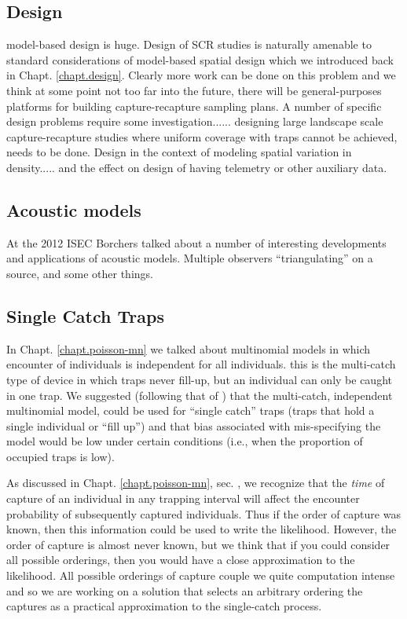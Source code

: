 \begin{table}[ht]
\subsection{Design}

model-based design is huge. Design of SCR studies is naturally
amenable to standard considerations of model-based spatial design
\citep{muller:2007} which we introduced back in
Chapt. \ref{chapt.design}. Clearly more work can be done on this
problem and we think at some point not too far into the future, there
will be general-purposes platforms for building capture-recapture
sampling plans.
A number of specific design problems require some
investigation...... designing large landscape scale capture-recapture
studies where uniform coverage with traps cannot be achieved, needs
to be done.
Design in the context of modeling spatial variation in
density..... and the effect on design of having telemetry or other
auxiliary data.


\subsection{Acoustic models}

At the 2012 ISEC Borchers talked about a number of interesting 
developments and applications of acoustic models. Multiple observers
``triangulating'' on a source, and some other things.

\subsection{Single Catch Traps}

In Chapt. \ref{chapt.poisson-mn} we talked about multinomial models in
which encounter of individuals is independent for all
individuals. this is the multi-catch type of device in which traps
never fill-up, but an individual can only be caught in one trap.  We
suggested (following that of \citet{efford_etal:2009euring}) that the
multi-catch, independent multinomial model, could be used for ``single
catch'' traps (traps that hold a single individual or ``fill up'') and
that bias associated with mis-specifying the model would be low under
certain conditions (i.e., when the proportion of occupied traps is
low).


As discussed in Chapt. \ref{chapt.poisson-mn}, 
sec. \label{poisson-mn.sec.singlecatch},
we recognize that the {\it time} of capture of an
individual in any trapping interval will affect the encounter
probability of subsequently captured individuals.  Thus if 
the order of capture was known, then this information could be 
used to write the likelihood.  However, the order of capture
is almost never known, but we think that if you could consider all
possible orderings, then you would have a close approximation to the
likelihood.  All possible orderings of capture couple we quite
computation intense and so we are working on a solution that selects
an arbitrary ordering the captures as a practical approximation to the
single-catch process. 


\end{table}
